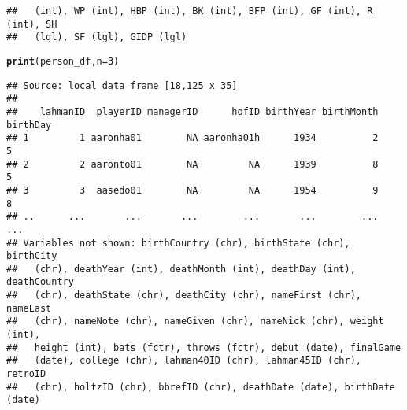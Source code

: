 \documentclass{beamer}\usepackage[]{graphicx}\usepackage[]{color}
\makeatletter
\newcommand{\hlnum}[1]{\textcolor[rgb]{0.686,0.059,0.569}{#1}}%
\newcommand{\hlstd}[1]{\textcolor[rgb]{0.345,0.345,0.345}{#1}}%
\newcommand{\hlkwc}[1]{\textcolor[rgb]{0.333,0.667,0.333}{#1}}%
\newcommand{\hlkwd}[1]{\textcolor[rgb]{0.737,0.353,0.396}{\textbf{#1}}}%
\newenvironment{kframe}{%
 \def\at@end@of@kframe{}%
 \ifinner\ifhmode%
  \def\at@end@of@kframe{\end{minipage}}%
  \begin{minipage}{\columnwidth}%
 \fi\fi%
 \def\FrameCommand##1{\hskip\@totalleftmargin \hskip-\fboxsep
 \colorbox{shadecolor}{##1}\hskip-\fboxsep
     \hskip-\linewidth \hskip-\@totalleftmargin \hskip\columnwidth}%
 \MakeFramed {\advance\hsize-\width
   \@totalleftmargin\z@ \linewidth\hsize
   \@setminipage}}%
 {\par\unskip\endMakeFramed%
 \at@end@of@kframe}
\newenvironment{knitrout}{}{} %
\makeatother
\begin{document}
\begin{frame}[fragile]
\begin{knitrout}
\begin{kframe}
\begin{verbatim}
##   (int), WP (int), HBP (int), BK (int), BFP (int), GF (int), R (int), SH
##   (lgl), SF (lgl), GIDP (lgl)
\end{verbatim}
\begin{alltt}
\hlkwd{print}\hlstd{(person_df,}   \hlkwc{n} \hlstd{=} \hlnum{3}\hlstd{)}
\end{alltt}
\begin{verbatim}
## Source: local data frame [18,125 x 35]
## 
##    lahmanID  playerID managerID      hofID birthYear birthMonth birthDay
## 1         1 aaronha01        NA aaronha01h      1934          2        5
## 2         2 aaronto01        NA         NA      1939          8        5
## 3         3  aasedo01        NA         NA      1954          9        8
## ..      ...       ...       ...        ...       ...        ...      ...
## Variables not shown: birthCountry (chr), birthState (chr), birthCity
##   (chr), deathYear (int), deathMonth (int), deathDay (int), deathCountry
##   (chr), deathState (chr), deathCity (chr), nameFirst (chr), nameLast
##   (chr), nameNote (chr), nameGiven (chr), nameNick (chr), weight (int),
##   height (int), bats (fctr), throws (fctr), debut (date), finalGame
##   (date), college (chr), lahman40ID (chr), lahman45ID (chr), retroID
##   (chr), holtzID (chr), bbrefID (chr), deathDate (date), birthDate (date)
\end{verbatim}
\end{kframe}
\end{knitrout}
\end{frame} 
\end{document}
